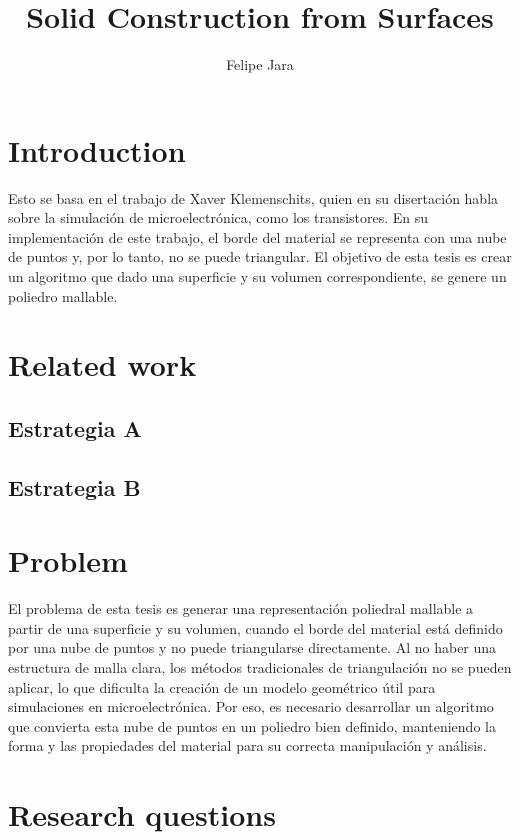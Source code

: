 \documentclass[submission]{eptcs}
\title{Solid Construction from Surfaces}
\author{ Felipe Jara
\institute{Department of Computer Science\\
University of Chile\\
Santiago, Chile}
\email{fjararibet@gmail.com}
}
\begin{document}
\maketitle

\section{Introduction}

Esto se basa en el trabajo de Xaver Klemenschits, quien en su disertación habla sobre la simulación de microelectrónica, como los transistores. En su implementación de este trabajo, el borde del material se representa con una nube de puntos y, por lo tanto, no se puede triangular. El objetivo de esta tesis es crear un algoritmo que dado una superficie y su volumen correspondiente, se genere un poliedro mallable.

\section{Related work}



\subsection{ Estrategia  A}




\subsection{ Estrategia B}


\section{Problem}

El problema de esta tesis es generar una representación poliedral mallable a partir de una superficie y su volumen, cuando el borde del material está definido por una nube de puntos y no puede triangularse directamente. Al no haber una estructura de malla clara, los métodos tradicionales de triangulación no se pueden aplicar, lo que dificulta la creación de un modelo geométrico útil para simulaciones en microelectrónica. Por eso, es necesario desarrollar un algoritmo que convierta esta nube de puntos en un poliedro bien definido, manteniendo la forma y las propiedades del material para su correcta manipulación y análisis.

\section{Research questions}
\end{document}
